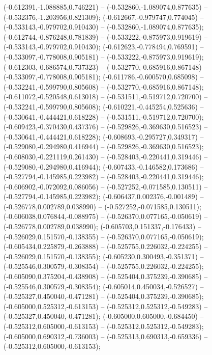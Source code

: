  (-0.612391,-1.088885,0.746221) -- (-0.532860,-1.089074,0.877635) -- (-0.532376,-1.203956,0.821309);
 (-0.612667,-0.979747,0.774045) -- (-0.533143,-0.979702,0.910430) -- (-0.532860,-1.089074,0.877635);
 (-0.612744,-0.876248,0.781839) -- (-0.533222,-0.875973,0.919619) -- (-0.533143,-0.979702,0.910430);
 (-0.612623,-0.778494,0.769591) -- (-0.533097,-0.778008,0.905181) -- (-0.533222,-0.875973,0.919619);
 (-0.612303,-0.686574,0.737323) -- (-0.532770,-0.685916,0.867148) -- (-0.533097,-0.778008,0.905181);
 (-0.611786,-0.600570,0.685098) -- (-0.532241,-0.599790,0.805608) -- (-0.532770,-0.685916,0.867148);
 (-0.611072,-0.520548,0.613018) -- (-0.531511,-0.519712,0.720700) -- (-0.532241,-0.599790,0.805608);
 (-0.610221,-0.445254,0.525636) -- (-0.530641,-0.444421,0.618228) -- (-0.531511,-0.519712,0.720700);
 (-0.609423,-0.370430,0.437376) -- (-0.529826,-0.369630,0.516523) -- (-0.530641,-0.444421,0.618228);
 (-0.608693,-0.295727,0.349317) -- (-0.529080,-0.294980,0.416944) -- (-0.529826,-0.369630,0.516523);
 (-0.608030,-0.221119,0.261430) -- (-0.528403,-0.220441,0.319446) -- (-0.529080,-0.294980,0.416944);
 (-0.607433,-0.146582,0.173686) -- (-0.527794,-0.145985,0.223982) -- (-0.528403,-0.220441,0.319446);
 (-0.606902,-0.072092,0.086056) -- (-0.527252,-0.071585,0.130511) -- (-0.527794,-0.145985,0.223982);
 (-0.606437,0.002376,-0.001489) -- (-0.526778,0.002789,0.038990) -- (-0.527252,-0.071585,0.130511);
 (-0.606038,0.076844,-0.088975) -- (-0.526370,0.077165,-0.050619) -- (-0.526778,0.002789,0.038990);
 (-0.605703,0.151337,-0.176433) -- (-0.526029,0.151570,-0.138355) -- (-0.526370,0.077165,-0.050619);
 (-0.605434,0.225879,-0.263888) -- (-0.525755,0.226032,-0.224255) -- (-0.526029,0.151570,-0.138355);
 (-0.605230,0.300493,-0.351371) -- (-0.525546,0.300579,-0.308354) -- (-0.525755,0.226032,-0.224255);
 (-0.605090,0.375204,-0.438908) -- (-0.525404,0.375239,-0.390685) -- (-0.525546,0.300579,-0.308354);
 (-0.605014,0.450034,-0.526527) -- (-0.525327,0.450040,-0.471281) -- (-0.525404,0.375239,-0.390685);
 (-0.605000,0.525312,-0.613153) -- (-0.525312,0.525312,-0.549283) -- (-0.525327,0.450040,-0.471281);
 (-0.605000,0.605000,-0.684450) -- (-0.525312,0.605000,-0.613153) -- (-0.525312,0.525312,-0.549283);
 (-0.605000,0.690312,-0.736003) -- (-0.525313,0.690313,-0.659336) -- (-0.525312,0.605000,-0.613153);
